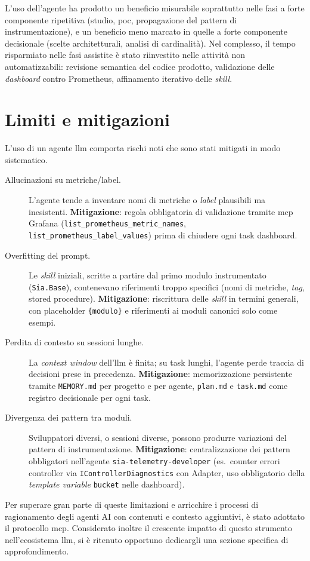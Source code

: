 L'uso dell'agente ha prodotto un beneficio misurabile soprattutto nelle fasi a forte
componente ripetitiva (studio, \gls{poc}, propagazione del pattern di instrumentazione), e un
beneficio meno marcato in quelle a forte componente decisionale (scelte architetturali,
analisi di cardinalità). Nel complesso, il tempo risparmiato nelle fasi assistite è stato
riinvestito nelle attività non automatizzabili: revisione semantica del codice prodotto,
validazione delle \emph{dashboard} contro Prometheus, affinamento iterativo delle
\emph{skill}.

\section{Limiti e mitigazioni}

L'uso di un agente \gls{llm} comporta rischi noti che sono stati mitigati in modo sistematico.

\begin{description}
    \item[Allucinazioni su metriche/label.] L'agente tende a inventare nomi di metriche o
        \emph{label} plausibili ma inesistenti. \textbf{Mitigazione}: regola obbligatoria di
        validazione tramite \gls{mcp} Grafana (\texttt{list\_prometheus\_metric\_names},
        \texttt{list\_prometheus\_label\_values}) prima di chiudere ogni task dashboard.
    \item[Overfitting del prompt.] Le \emph{skill} iniziali, scritte a partire dal primo
        modulo instrumentato (\texttt{Sia.Base}), contenevano riferimenti troppo specifici
        (nomi di metriche, \emph{tag}, stored procedure). \textbf{Mitigazione}: riscrittura
        delle \emph{skill} in termini generali, con placeholder \texttt{\{modulo\}} e
        riferimenti ai moduli canonici solo come esempi.
    \item[Perdita di contesto su sessioni lunghe.] La \emph{context window} dell'\gls{llm} è
        finita; su task lunghi, l'agente perde traccia di decisioni prese in precedenza.
        \textbf{Mitigazione}: memorizzazione persistente tramite \texttt{MEMORY.md} per
        progetto e per agente, \texttt{plan.md} e \texttt{task.md} come registro decisionale
        per ogni task.
    \item[Divergenza dei pattern tra moduli.] Sviluppatori diversi, o sessioni diverse, possono
        produrre variazioni del pattern di instrumentazione. \textbf{Mitigazione}:
        centralizzazione dei pattern obbligatori nell'agente \texttt{sia-telemetry-developer}
        (es.\ counter errori controller via \texttt{IControllerDiagnostics} con Adapter, uso
        obbligatorio della \emph{template variable} \texttt{bucket} nelle dashboard).
\end{description}
Per superare gran parte di queste limitazioni e arricchire i processi di ragionamento degli agenti AI
con contenuti e contesto aggiuntivi, è stato adottato il protocollo \gls{mcp}.
Considerato inoltre il crescente impatto di questo strumento nell’ecosistema \gls{llm}, 
si è ritenuto opportuno dedicargli una sezione specifica di approfondimento.


